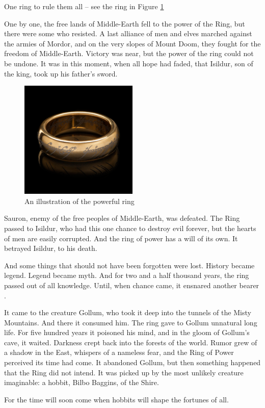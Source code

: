 One ring to rule them all -- see the ring in Figure \ref{fig:ring}

One by one, the free lands of Middle-Earth fell to the power of the Ring, but there were some who resisted. A last alliance of men and elves marched against the armies of Mordor, and on the very slopes of Mount Doom, they fought for the freedom of Middle-Earth. Victory was near, but the power of the ring could not be undone. It was in this moment, when all hope had faded, that Isildur, son of the king, took up his father’s sword.


\begin{figure}
    \centering
    \includegraphics[width=0.5\textwidth]{src/imgs/ring.jpg}
    \caption{An illustration of the powerful ring}
    \label{fig:ring}
\end{figure}


Sauron, enemy of the free peoples of Middle-Earth, was defeated. The Ring passed to Isildur, who had this one chance to destroy evil forever, but the hearts of men are easily corrupted. And the ring of power has a will of its own. It betrayed Isildur, to his death.

And some things that should not have been forgotten were lost. History became legend. Legend became myth. And for two and a half thousand years, the ring passed out of all knowledge. Until, when chance came, it ensnared another bearer \cite{tolkien2012fellowship}.

It came to the creature Gollum, who took it deep into the tunnels of the Misty Mountains. And there it consumed him. The ring gave to Gollum unnatural long life. For five hundred years it poisoned his mind, and in the gloom of Gollum’s cave, it waited. Darkness crept back into the forests of the world. Rumor grew of a shadow in the East, whispers of a nameless fear, and the Ring of Power perceived its time had come. It abandoned Gollum, but then something happened that the Ring did not intend. It was picked up by the most unlikely creature imaginable: a hobbit, Bilbo Baggins, of the Shire.

For the time will soon come when hobbits will shape the fortunes of all.